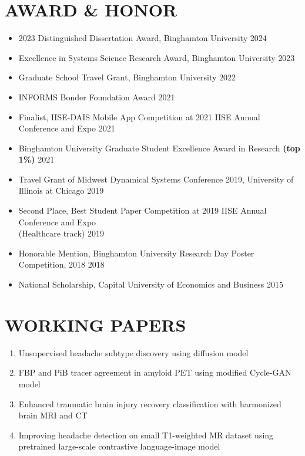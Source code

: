 \documentclass[10pt]{article}
\begin{document}
\section*{AWARD \& HONOR}
\begin{itemize}
	\item 2023 Distinguished Dissertation Award, Binghamton University
	\hfill{2024}
    \item Excellence in Systems Science Research Award, Binghamton University
	\hfill{2023}
    \item Graduate School Travel Grant, Binghamton University
	\hfill{2022}
	\item INFORMS Bonder Foundation Award
	\hfill{2021}
	\item Finalist, IISE-DAIS Mobile App Competition at 2021 IISE Annual Conference and Expo
	\hfill{2021}
	\item Binghamton University Graduate Student Excellence Award in Research \textbf{(top 1\%)}
	\hfill{2021}
	\item Travel Grant of Midwest Dynamical Systems Conference 2019, University of Illinois at Chicago 
	\hfill{2019}
	\item Second Place, Best Student Paper Competition at 2019 IISE Annual Conference and Expo \\(Healthcare track)
	\hfill{2019}
	\item Honorable Mention, Binghamton University Research Day Poster Competition, 2018
	\hfill{2018}
	\item National Scholarship, Capital University of Economics and Business
	\hfill{2015}
\end{itemize}

\section*{WORKING PAPERS}
\begin{enumerate}
	\item Unsupervised headache subtype discovery using diffusion model
	
	\item FBP and PiB tracer agreement in amyloid PET using modified Cycle-GAN model

	\item Enhanced traumatic brain injury recovery classification with harmonized brain MRI and CT
	
	\item Improving headache detection on small T1-weighted MR dataset using pretrained large-scale contrastive language-image model
\end{enumerate}
\end{document}
